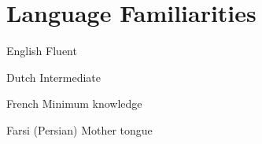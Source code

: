 \section{Language Familiarities}
\begin{CV}
\item [English] Fluent
\item [Dutch] Intermediate
\item [French] Minimum knowledge
\item [Farsi (Persian)]  Mother tongue
\end{CV}
